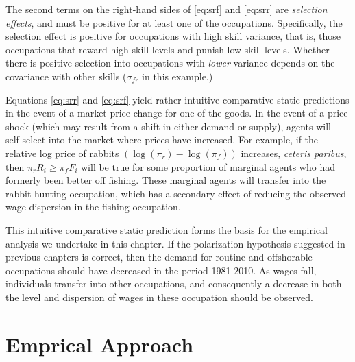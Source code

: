The second terms on the right-hand sides of \eqref{eq:srf} and \eqref{eq:srr} are {\em selection effects}, and must be positive for at least one of the occupations. Specifically, the selection effect is positive for occupations with high skill variance, that is, those occupations that reward high skill levels and punish low skill levels. Whether there is positive selection into occupations with {\em lower} variance depends on the covariance with other skills ($\sigma_{fr}$ in this example.)

Equations \eqref{eq:srr} and \eqref{eq:srf} yield rather intuitive comparative static predictions in the event of a market price change for one of the goods. In the event of a price shock (which may result from a shift in either demand or supply), agents will self-select into the market where prices have increased. For example, if the relative log price of rabbits ${\left(\log(\pi_r)-\log(\pi_f)\right)}$ increases, {\em ceteris paribus}, then ${\pi_rR_i \geq \pi_fF_i}$ will be true for some proportion of marginal agents who had formerly been better off fishing. These marginal agents will transfer into the rabbit-hunting occupation, which has a secondary effect of reducing the observed wage dispersion in the fishing occupation.

This intuitive comparative static prediction forms the basis for the empirical analysis we undertake in this chapter. If the polarization hypothesis suggested in previous chapters is correct, then the demand for routine and offshorable occupations should have decreased in the period 1981-2010. As wages fall, individuals transfer into other occupations, and consequently a decrease in both the level and dispersion of wages in these occupation should be observed.


\section{Emprical Approach}\label{sec:emp}

